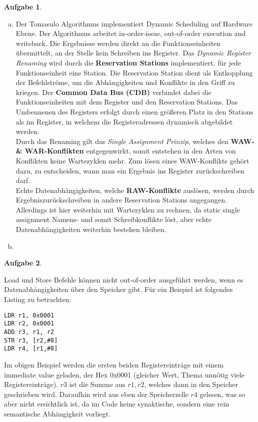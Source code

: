 \documentclass[a4paper,12pt,headsepline]{scrartcl}
\newtheorem{aufgabe}{Aufgabe}
\begin{document}
\begin{aufgabe}
\end{aufgabe}
\begin{enumerate}[a)]
	\item Der Tomasulo Algorithmus implementiert Dynamic Scheduling auf Hardware Ebene. Der Algorithmus arbeitet in-order-issue, out-of-order execution and writeback. Die Ergebnisse werden direkt an die Funktionseinheiten übermittelt, an der Stelle kein Schreiben ins Register. Das \textit{Dynamic Register Renaming} wird durch die \textbf{Reservation Stations} implementiert, für jede Funktionseinheit eine Station. Die Reservation Station dient als Entkopplung der Befehlströme, um die Abhängigkeiten und Konflikte in den Griff zu kriegen. Der \textbf{Common Data Bus (CDB)} verbindet dabei die Funktionseinheiten mit dem Register und den Reservation Stations. Das Umbennenen des Registers erfolgt durch einen größeren Platz in den Stations als im Register, in welchem die Registeradressen dynamisch abgebildet werden. \\
	Durch das Renaming gilt das \textit{Single Assignment Prinzip}, welches den \textbf{WAW- \& WAR-Konflikten} entgegenwirkt, somit entstehen in den Arten von Konflikten keine Wartezyklen mehr. Zum lösen eines WAW-Konflikts gehört dazu, zu entscheiden, wann man ein Ergebnis ins Register zurückschreiben darf.\\
	Echte Datenabhängigkeiten, welche \textbf{RAW-Konflikte} auslösen, werden durch Ergebniszurückschreiben in andere Reservation Stations angegangen. Allerdings ist hier weiterhin mit Wartezyklen zu rechnen, da static single assignment Namens- und somit Schreibkonflikte löst, aber echte Datenabhängigkeiten weiterhin bestehen bleiben.
	\item 
\end{enumerate}
\begin{aufgabe}
\end{aufgabe}
Load und Store Befehle können nicht out-of-order ausgeführt werden, wenn es Datenabhängigkeiten über den Speicher gibt. Für ein Beispiel ist folgendes Listing zu betrachten:
\begin{lstlisting}[frame=single]
LDR r1, 0x0001
LDR r2, 0x0001
ADD r3, r1, r2
STR r3, [r2,#8]
LDR r4, [r1,#8]
\end{lstlisting}
Im obigen Beispiel werden die ersten beiden Registereinträge mit einem immediate value geladen, der Hex 0x0001 (gleicher Wert, Thema unnötig viele Registereinträge). $r3$ ist die Summe aus $r1, r2$, welches dann in den Speicher geschrieben wird. Daraufhin wird aus eben der Speicherzelle $r4$ gelesen, was so aber nicht ersichtlich ist, da im Code keine synaktische, sondern eine rein semantische Abhängigkeit vorliegt.\\
\end{document}
